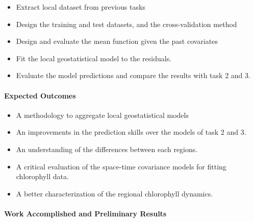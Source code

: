 \begin{itemize}
\item Extract local dataset from previous tasks
\item Design the training and test datasets, and the cross-validation method
\item Design and evaluate the mean function given the past covariates
\item Fit the local geostatistical model to the residuals.
\item Evaluate the model predictions and compare the results with task 2 and 3.
\end{itemize}

\paragraph{Expected Outcomes}

\begin{itemize}
\item A methodology to aggregate local geostatistical models
\item An improvements in the prediction skills over the models of task 2 and 3.
\item An understanding of the differences between each regions.
\item A critical evaluation of the space-time covariance models for fitting chlorophyll data.
\item A better characterization of the regional chlorophyll dynamics.
\end{itemize}

\paragraph{Work Accomplished and Preliminary Results}

